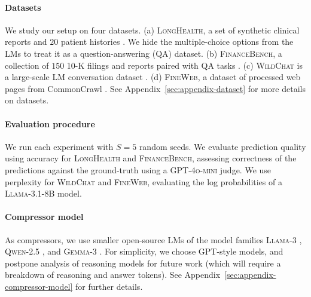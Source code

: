 \documentclass{article} %
\begin{document}
\paragraph*{Datasets} 
We study our setup on four datasets. (a) \textsc{LongHealth}, a set of synthetic clinical reports and $20$ patient histories \citep{adams2024longhealth}. We hide the multiple-choice options from the LMs to treat it as a question-answering (QA) dataset. (b) \textsc{FinanceBench}, a collection of $150$ 10-K filings and reports paired with QA tasks \citep{islam2023financebench}. (c) \textsc{WildChat} is a large-scale LM conversation dataset \citep{zhao2024wildchat}. (d) \textsc{FineWeb}, a dataset of processed web pages from CommonCrawl \citep{penedo2024the}. See Appendix~\ref{sec:appendix-dataset} for more details on datasets.

\paragraph*{Evaluation procedure} We run each experiment with $S=5$ random seeds. We evaluate prediction quality using accuracy for \textsc{LongHealth} and \textsc{FinanceBench}, assessing correctness of the predictions against the ground-truth using a \textsc{GPT-4o-mini} judge. We use perplexity for \textsc{WildChat} and \textsc{FineWeb}, evaluating the log probabilities of a \textsc{Llama-3.1-8B} model.

\paragraph*{Compressor model} 
As compressors, we use smaller open-source LMs of the model families \textsc{Llama-3} \citep{grattafiori2024llama3herdmodels}, \textsc{Qwen-2.5} \citep{qwen2025qwen25technicalreport}, and \textsc{Gemma-3} \citep{team2025gemma}. For simplicity, we choose \textsc{GPT}-style models, and postpone analysis of reasoning models for future work (which will require a breakdown of reasoning and answer tokens).
See Appendix~\ref{sec:appendix-compressor-model} for further details.
\end{document}
